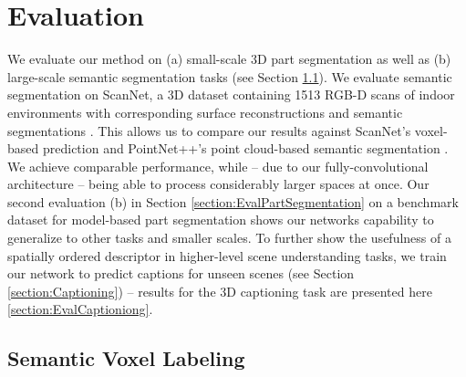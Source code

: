 \documentclass[runningheads]{llncs}
\begin{document}
\section{Evaluation}





We evaluate our method on (a) small-scale 3D part segmentation as well as (b) large-scale semantic segmentation tasks (see Section \ref{section:EvalSVL}). We evaluate semantic segmentation on ScanNet, a 3D dataset containing 1513 RGB-D scans of indoor environments with corresponding surface reconstructions and semantic segmentations \cite{Dai2017}. This allows us to compare our results against ScanNet's voxel-based prediction \cite{Dai2017} and PointNet++'s point cloud-based semantic segmentation \cite{Qi2017_2}. We achieve comparable performance, while -- due to our fully-convolutional architecture -- being able to process considerably larger spaces at once. Our second evaluation (b) in Section \ref{section:EvalPartSegmentation} on a benchmark dataset for model-based part segmentation shows our networks capability to generalize to other tasks and smaller scales. To further show the usefulness of a spatially ordered descriptor in higher-level scene understanding tasks, we train our network to predict captions for unseen scenes (see Section \ref{section:Captioning}) -- results for the 3D captioning task are presented here \ref{section:EvalCaptioniong}. %

\subsection{Semantic Voxel Labeling}
\label{section:EvalSVL}
\end{document}
